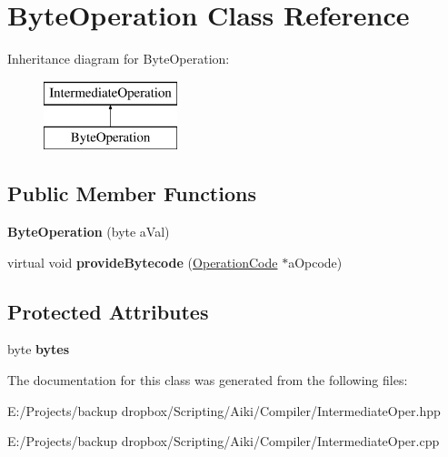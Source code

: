\hypertarget{a00004}{\section{Byte\+Operation Class Reference}
\label{a00004}
}
Inheritance diagram for Byte\+Operation\+:\begin{figure}[H]
\begin{center}
\leavevmode
\includegraphics[height=2.000000cm]{d0/d0b/a00004}
\end{center}
\end{figure}
\subsection*{Public Member Functions}
\begin{DoxyCompactItemize}
\item 
\hypertarget{a00004_a543d45bb590172595c94e311316b8867}{{\bfseries Byte\+Operation} (byte a\+Val)}\label{a00004_a543d45bb590172595c94e311316b8867}

\item 
\hypertarget{a00004_a800ac43c60473150dfe5065a0d11156f}{virtual void {\bfseries provide\+Bytecode} (\hyperlink{a00015}{Operation\+Code} $\ast$a\+Opcode)}\label{a00004_a800ac43c60473150dfe5065a0d11156f}

\end{DoxyCompactItemize}
\subsection*{Protected Attributes}
\begin{DoxyCompactItemize}
\item 
\hypertarget{a00004_a8d178848a7de61060bb4ff11c8d7b816}{byte {\bfseries bytes}}\label{a00004_a8d178848a7de61060bb4ff11c8d7b816}

\end{DoxyCompactItemize}


The documentation for this class was generated from the following files\+:\begin{DoxyCompactItemize}
\item 
E\+:/\+Projects/backup dropbox/\+Scripting/\+Aiki/\+Compiler/Intermediate\+Oper.\+hpp\item 
E\+:/\+Projects/backup dropbox/\+Scripting/\+Aiki/\+Compiler/Intermediate\+Oper.\+cpp\end{DoxyCompactItemize}
